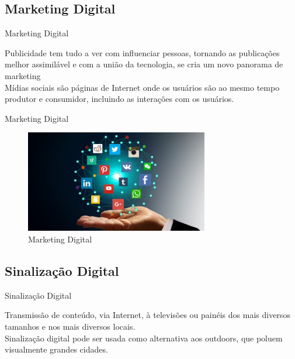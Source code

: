 \documentclass{aula-ifb}
\begin{document}
\subsection{Marketing Digital}
\begin{frame}{Marketing Digital}
\begin{center}
Publicidade tem tudo a ver com influenciar pessoas, tornando as publicações melhor assimilável e com a união da tecnologia, se cria um novo panorama de marketing  \cite{ryan2016}\\
\vspace{20px}
Mídias sociais são páginas de Internet onde os usuários são ao mesmo tempo produtor e consumidor, incluindo as interações com os usuários.  \cite{torres2000} 
\end{center}
\end{frame}

\begin{frame}{Marketing Digital}
\begin{figure}[h]
\includegraphics[width=8cm]{figuras/marketingdigital.png}
\caption{Marketing Digital \cite{figura1}}
\label{fig:siteifb}
\end{figure}
\end{frame}

\subsection{Sinalização Digital}
\begin{frame}{Sinalização Digital}
\begin{center}
Transmissão de conteúdo, via Internet, à televisões ou painéis dos mais diversos tamanhos e nos mais diversos locais. \cite{machado2010}\\

\vspace{20px}
Sinalização digital pode ser usada como alternativa aos outdoors, que poluem visualmente grandes cidades. \cite{cintra2010}

\end{center}
\end{frame}
\end{document}
